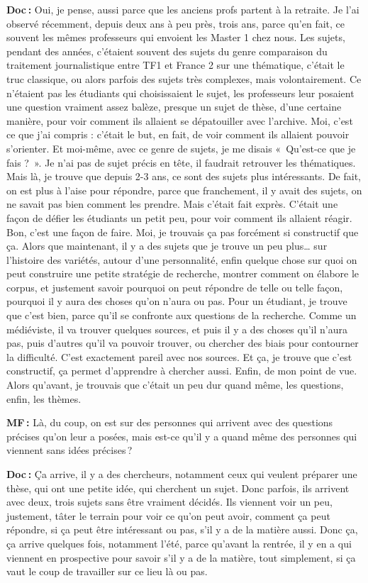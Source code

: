 \textbf{Doc :} Oui, je pense, aussi parce que les anciens profs partent à la retraite. Je l'ai observé récemment, depuis deux ans à peu près, trois ans, parce qu'en fait, ce souvent les mêmes professeurs qui envoient les Master 1 chez nous. Les sujets, pendant des années, c'étaient souvent des sujets du genre comparaison du traitement journalistique entre TF1 et France 2 sur une thématique, c'était le truc classique, ou alors parfois des sujets très complexes, mais volontairement. Ce n’étaient pas les étudiants qui choisissaient le sujet, les professeurs leur posaient une question vraiment assez balèze, presque un sujet de thèse, d'une certaine manière, pour voir comment ils allaient se dépatouiller avec l'archive.  Moi, c'est ce que j'ai compris : c'était le but, en fait, de voir comment ils allaient pouvoir s'orienter. Et moi-même, avec ce genre de sujets, je me disais « Qu'est-ce que je fais ? ». Je n'ai pas de sujet précis en tête, il faudrait retrouver les thématiques. Mais là, je trouve que depuis 2-3 ans, ce sont des sujets plus intéressants. De fait, on est plus à l'aise pour répondre, parce que franchement, il y avait des sujets, on ne savait pas bien comment les prendre. Mais c'était fait exprès. C'était une façon de défier les étudiants un petit peu, pour voir comment ils allaient réagir. Bon, c'est une façon de faire.  Moi, je trouvais ça pas forcément si constructif que ça. Alors que maintenant, il y a des sujets que je trouve un peu plus… sur l'histoire des variétés, autour d'une personnalité, enfin quelque chose sur quoi on peut construire une petite stratégie de recherche, montrer comment on élabore le corpus, et justement savoir pourquoi on peut répondre de telle ou telle façon, pourquoi il y aura des choses qu'on n'aura ou pas. Pour un étudiant, je trouve que c'est bien, parce qu'il se confronte aux questions de la recherche. Comme un médiéviste, il va trouver quelques sources, et puis il y a des choses qu'il n'aura pas, puis d'autres qu'il va pouvoir trouver, ou chercher des biais pour contourner la difficulté. C'est exactement pareil avec nos sources. Et ça, je trouve que c'est constructif, ça permet d'apprendre à chercher aussi. Enfin, de mon point de vue. Alors qu'avant, je trouvais que c'était un peu dur quand même, les questions, enfin, les thèmes. 

\textbf{MF :} Là, du coup, on est sur des personnes qui arrivent avec des questions précises qu'on leur a posées, mais est-ce qu'il y a quand même des personnes qui viennent sans idées précises ? 

\textbf{Doc :} Ça arrive, il y a des chercheurs, notamment ceux qui veulent préparer une thèse, qui ont une petite idée, qui cherchent un sujet. Donc parfois, ils arrivent avec deux, trois sujets sans être vraiment décidés. Ils viennent voir un peu, justement, tâter le terrain pour voir ce qu'on peut avoir, comment ça peut répondre, si ça peut être intéressant ou pas, s'il y a de la matière aussi. Donc ça, ça arrive quelques fois, notamment l'été, parce qu'avant la rentrée, il y en a qui viennent en prospective pour savoir s'il y a de la matière, tout simplement, si ça vaut le coup de travailler sur ce lieu là ou pas. 

